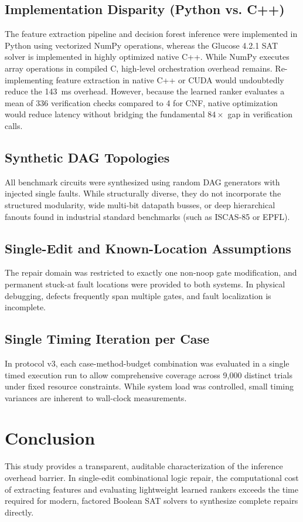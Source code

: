 \documentclass[10pt,journal,compsoc]{IEEEtran}
\begin{document}
\subsection{Implementation Disparity (Python vs. C++)}
The feature extraction pipeline and decision forest inference were implemented in Python using vectorized NumPy operations, whereas the Glucose 4.2.1 SAT solver is implemented in highly optimized native C++. While NumPy executes array operations in compiled C, high-level orchestration overhead remains. Re-implementing feature extraction in native C++ or CUDA would undoubtedly reduce the 143~ms overhead. However, because the learned ranker evaluates a mean of 336 verification checks compared to 4 for CNF, native optimization would reduce latency without bridging the fundamental $84\times$ gap in verification calls.

\subsection{Synthetic DAG Topologies}
All benchmark circuits were synthesized using random DAG generators with injected single faults. While structurally diverse, they do not incorporate the structured modularity, wide multi-bit datapath busses, or deep hierarchical fanouts found in industrial standard benchmarks (such as ISCAS-85 or EPFL).

\subsection{Single-Edit and Known-Location Assumptions}
The repair domain was restricted to exactly one non-noop gate modification, and permanent stuck-at fault locations were provided to both systems. In physical debugging, defects frequently span multiple gates, and fault localization is incomplete.

\subsection{Single Timing Iteration per Case}
In protocol v3, each case-method-budget combination was evaluated in a single timed execution run to allow comprehensive coverage across 9,000 distinct trials under fixed resource constraints. While system load was controlled, small timing variances are inherent to wall-clock measurements.

\section{Conclusion}
This study provides a transparent, auditable characterization of the inference overhead barrier. In single-edit combinational logic repair, the computational cost of extracting features and evaluating lightweight learned rankers exceeds the time required for modern, factored Boolean SAT solvers to synthesize complete repairs directly. 
\end{document}
